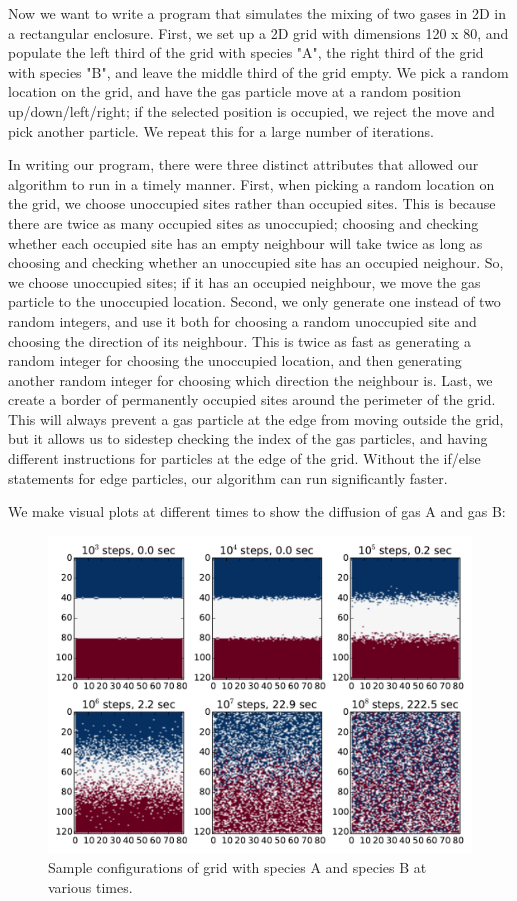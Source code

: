 \documentclass{article}
\begin{document}
\smallskip
Now we want to write a program that simulates the mixing of two gases in 2D in a rectangular enclosure. First, we set up a 2D grid with dimensions 120 x 80, and populate the left third of the grid with species "A", the right third of the grid with species "B", and leave the middle third of the grid empty. We pick a random location on the grid, and have the gas particle move at a random position up/down/left/right; if the selected position is occupied, we reject the move and pick another particle. We repeat this for a large number of iterations. \par
In writing our program, there were three distinct attributes that allowed our algorithm to run in a timely manner. First, when picking a random location on the grid, we choose unoccupied sites rather than occupied sites. This is because there are twice as many occupied sites as unoccupied; choosing and checking whether each occupied site has an empty neighbour will take twice as long as choosing and checking whether an unoccupied site has an occupied neighour. So, we choose unoccupied sites; if it has an occupied neighbour, we move the gas particle to the unoccupied location. Second, we only generate one instead of two random integers, and use it both for choosing a random unoccupied site and choosing the direction of its neighbour. This is twice as fast as generating a random integer for choosing the unoccupied location, and then generating another random integer for choosing which direction the neighbour is. Last, we create a border of permanently occupied sites around the perimeter of the grid. This will always prevent a gas particle at the edge from moving outside the grid, but it allows us to sidestep checking the index of the gas particles, and having different instructions for particles at the edge of the grid. Without the if/else statements for edge particles, our algorithm can run significantly faster.\par
We make visual plots at different times to show the diffusion of gas A and gas B:\par
\begin{figure}[H]
\centering
\includegraphics[width=12cm]{GP1_3b_1.pdf}
\caption{Sample configurations of grid with species A and species B at various times.}
\label{fig:grid}
\end{figure}
\end{document}
